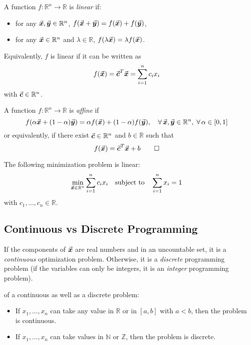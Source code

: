 \begin{definition}
A function \(f:\mathbb{R}^{n}\rightarrow\mathbb{R}\) is \emph{linear} if:
\begin{itemize}
	\item for any \(\vec{\boldsymbol{x}},\vec{\boldsymbol{y}}\in\mathbb{R}^{n}\), \(f(\vec{\boldsymbol{x}}+\vec{\boldsymbol{y}})=f(\vec{\boldsymbol{x}})+f(\vec{\boldsymbol{y}})\),
	\item for any \(\vec{\boldsymbol{x}}\in\mathbb{R}^{n}\) and \(\lambda\in\mathbb{R}\), \(f(\lambda\vec{\boldsymbol{x}})=\lambda f(\vec{\boldsymbol{x}})\).
\end{itemize}
Equivalently, \(f\) is linear if it can be written as
\[
f(\vec{\boldsymbol{x}})=\vec{\boldsymbol{c}}^{T}\vec{\boldsymbol{x}}=\sum_{i=1}^{n} c_{i}x_{i}
\]
with \(\vec{\boldsymbol{c}}\in\mathbb{R}^{n}\).
\end{definition}

\begin{definition}\label{def:affine_function}
A function \(f:\mathbb{R}^{n}\rightarrow\mathbb{R}\) is \emph{affine} if
\[
f(\alpha\vec{\boldsymbol{x}}+(1-\alpha)\vec{\boldsymbol{y}})=\alpha f(\vec{\boldsymbol{x}})+(1-\alpha)f(\vec{\boldsymbol{y}}),\quad \forall\, \vec{\boldsymbol{x}},\vec{\boldsymbol{y}}\in\mathbb{R}^{n},\; \forall\, \alpha\in[0,1]
\]
or equivalently, if there exist \(\vec{\boldsymbol{c}}\in\mathbb{R}^{n}\) and \(b\in\mathbb{R}\) such that
\[
f(\vec{\boldsymbol{x}})=\vec{\boldsymbol{c}}^{T}\vec{\boldsymbol{x}}+b\qedhere
\]
\end{definition}

\begin{example}
The following minimization problem is linear:
\[
\min_{\vec{\boldsymbol{x}}\in\mathbb{R}^{n}} \sum_{i=1}^{n} c_{i}x_{i} \quad \text{subject to} \quad \sum_{i=1}^{n} x_{i}=1
\]
with \(c_{1}, \ldots, c_{n}\in\mathbb{R}\).
\end{example}

\subsection{Continuous vs Discrete Programming}

If the components of \(\vec{\boldsymbol{x}}\) are real numbers and in an uncountable set, it is a \emph{continuous} optimization problem. Otherwise, it is a \emph{discrete} programming problem (if the variables can only be integers, it is an \emph{integer} programming problem).

\begin{example}
of a continuous as well as a discrete problem:
\begin{itemize}
	\item If \(x_{1},\ldots, x_{n}\) can take any value in \(\mathbb{R}\) or in \([a,b]\) with \(a<b\), then the problem is continuous.
	\item If \(x_{1},\ldots, x_{n}\) can take values in \(\mathbb{N}\) or \(\mathbb{Z}\), then the problem is discrete.\qedhere
\end{itemize}
\end{example}


